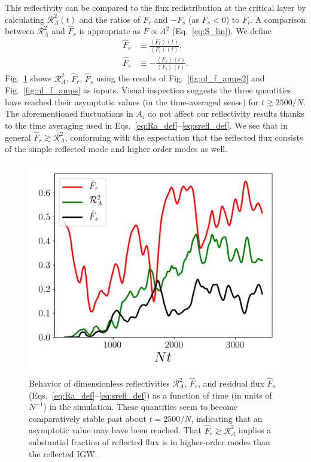 \documentclass[
        fleqn,
        usenatbib,
        referee,
    ]{mnras}
\newcommand*{\ev}[1]{\left\langle#1\right\rangle}
\begin{document}
This reflectivity can be compared to the flux redistribution at the critical
layer by calculating $\mathcal{R}_A^2(t)$ and the ratios of $F_r$ and $-F_s$ (as
$F_s < 0$) to $F_i$. A comparison between $\mathcal{R}_A^2$ and $\hat{F}_r$ is
appropriate as $F \propto A^2$ (Eq.~\eqref{eq:S_lin}). We define \begin{align}
\hat{F}_r &\equiv \frac{\ev{F_r}(t)}{\ev{F_i}(t)}, \label{eq:srefl_def1}\\
\hat{F}_s &\equiv -\frac{\ev{F_s}(t)}{\ev{F_i}(t)}. \label{eq:srefl_def}
\end{align} Fig.~\ref{fig:nl_f_refl} shows $\mathcal{R}_A^2$, $\hat{F}_r$,
$\hat{F}_s$ using the results of Fig.~\ref{fig:nl_f_amps2} and
Fig.~\ref{fig:nl_f_amps} as inputs. Visual inspection suggests the three
quantities have reached their asymptotic values (in the time-averaged sense) for
$t \gtrsim 2500/N$. The aforementioned fluctuations in $A_i$ do not affect our
reflectivity results thanks to the time averaging used in
Eqs.~\eqref{eq:Ra_def}--\eqref{eq:srefl_def}.%
We see that in general $\hat{F}_r \gtrsim \mathcal{R}_A^2$, conforming with the
expectation that the reflected flux consists of the simple reflected mode and
higher order modes as well.
\begin{figure}
    \centering
    \includegraphics[width=0.9\columnwidth]{plots/nl_f_refl.png}
    \caption{Behavior of dimensionless reflectivities $\mathcal{R}_A^2$,
    $\hat{F}_r$, and residual flux $\hat{F}_s$
    (Eqs.~\eqref{eq:Ra_def}--\eqref{eq:srefl_def}) as a function of time (in
    units of $N^{-1}$) in the simulation. These quantities seem to become
    comparatively stable past about $t = 2500/N$, indicating that an asymptotic
    value may have been reached. That $\hat{F}_r \gtrsim \mathcal{R}_A^2$
    implies a substantial fraction of reflected flux is in higher-order modes
    than the reflected IGW.}\label{fig:nl_f_refl}
\end{figure}
\end{document}
